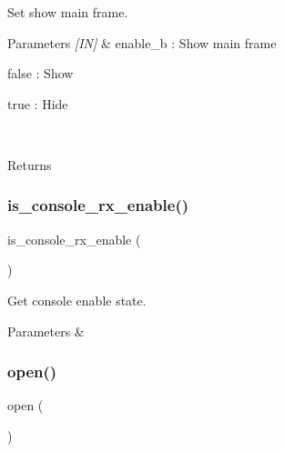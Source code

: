 Set show main frame. 


\begin{DoxyCode}{0}
\end{DoxyCode}



\begin{DoxyParams}{Parameters}
{\em \mbox{[}\+I\+N\mbox{]}} & enable\+\_\+b \+: Show main frame \begin{DoxyItemize}
\item false \+: Show \item true \+: Hide \end{DoxyItemize}
\\
\hline
\end{DoxyParams}
\begin{DoxyReturn}{Returns}

\end{DoxyReturn}
\mbox{\label{classmain__frame_a52c27dfc34aa450413b632c62a2e1266}} 
\subsubsection{is\_console\_rx\_enable()}
{\footnotesize\ttfamily is\+\_\+console\+\_\+rx\+\_\+enable (\begin{DoxyParamCaption}{ }\end{DoxyParamCaption})}



Get console enable state. 


\begin{DoxyCode}{0}
\end{DoxyCode}



\begin{DoxyParams}{Parameters}
{\em } & \\
\hline
\end{DoxyParams}
\mbox{\label{classmain__frame_a44a2ac59a3b91f8c18905dce700934d6}} 
\subsubsection{open()\hspace{0.1cm}{\footnotesize\ttfamily [1/2]}}
{\footnotesize\ttfamily open (\begin{DoxyParamCaption}{ }\end{DoxyParamCaption})}



